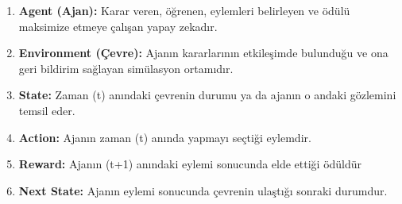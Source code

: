 \documentclass{article}
\begin{document}
\begin{enumerate}
    \item \textbf{Agent (Ajan):} Karar veren, öğrenen,  eylemleri belirleyen ve ödülü maksimize etmeye çalışan yapay zekadır.

    \item \textbf{Environment (Çevre):} Ajanın kararlarının etkileşimde bulunduğu ve ona geri bildirim sağlayan simülasyon ortamıdır.

    \item \textbf{State:} Zaman (t) anındaki çevrenin durumu ya da ajanın o andaki gözlemini temsil eder.

    \item \textbf{Action:} Ajanın zaman (t) anında yapmayı seçtiği eylemdir.

    \item \textbf{Reward:} Ajanın (t+1) anındaki eylemi sonucunda elde ettiği ödüldür

    \item \textbf{Next State:} Ajanın eylemi sonucunda çevrenin ulaştığı sonraki durumdur.
\end{enumerate}

\newpage
\end{document}
